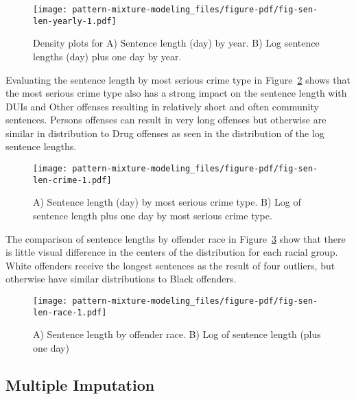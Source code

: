 \documentclass[
  letterpaper,
  DIV=11,
  numbers=noendperiod]{scrartcl}
\begin{document}
\begin{figure}

{\centering \texttt{[image: pattern-mixture-modeling\_files/figure-pdf/fig-sen-len-yearly-1.pdf]}

}

\caption{\label{fig-sen-len-yearly}Density plots for A) Sentence length
(day) by year. B) Log sentence lengths (day) plus one day by year.}

\end{figure}

Evaluating the sentence length by most serious crime type in
Figure~\ref{fig-sen-len-crime} shows that the most serious crime type
also has a strong impact on the sentence length with DUIs and Other
offenses resulting in relatively short and often community sentences.
Persons offenses can result in very long offenses but otherwise are
similar in distribution to Drug offenses as seen in the distribution of
the log sentence lengths.

\begin{figure}

{\centering \texttt{[image: pattern-mixture-modeling\_files/figure-pdf/fig-sen-len-crime-1.pdf]}

}

\caption{\label{fig-sen-len-crime}A) Sentence length (day) by most
serious crime type. B) Log of sentence length plus one day by most
serious crime type.}

\end{figure}

The comparison of sentence lengths by offender race in
Figure~\ref{fig-sen-len-race} show that there is little visual
difference in the centers of the distribution for each racial group.
White offenders receive the longest sentences as the result of four
outliers, but otherwise have similar distributions to Black offenders.

\begin{figure}

{\centering \texttt{[image: pattern-mixture-modeling\_files/figure-pdf/fig-sen-len-race-1.pdf]}

}

\caption{\label{fig-sen-len-race}A) Sentence length by offender race. B)
Log of sentence length (plus one day)}

\end{figure}

\hypertarget{multiple-imputation}{%
\subsection{Multiple Imputation}\label{multiple-imputation}}
\end{document}
